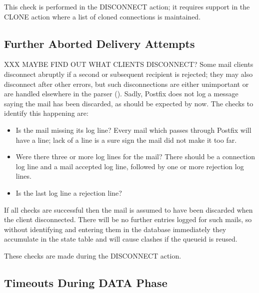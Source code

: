 This check is performed in the DISCONNECT action; it requires support in
the CLONE action where a list of cloned connections is maintained.


\newpage{} %

\subsection{Further Aborted Delivery Attempts}

XXX MAYBE FIND OUT WHAT CLIENTS DISCONNECT\@?  Some mail clients disconnect
abruptly if a second or subsequent recipient is rejected; they may also
disconnect after other errors, but such disconnections are either
unimportant or are handled elsewhere in the parser
().  Sadly, Postfix does not log a
message saying the mail has been discarded, as should be expected by now.
The checks to identify this happening are:

\begin{itemize}

    \item Is the mail missing its  log line?  Every mail
        which passes through Postfix will have a  line;
        lack of a  line is a sure sign the mail did not
        make it too far.

    \item Were there three or more  log lines for the mail?
        There should be a connection log line and a mail accepted log line,
        followed by one or more rejection log lines.

    \item Is the last  log line a rejection line?

\end{itemize}

If all checks are successful then the mail is assumed to have been
discarded when the client disconnected.  There will be no further entries
logged for such mails, so without identifying and entering them in the
database immediately they accumulate in the state table and will cause
clashes if the queueid is reused.

These checks are made during the DISCONNECT action.

\subsection{Timeouts During DATA Phase}

